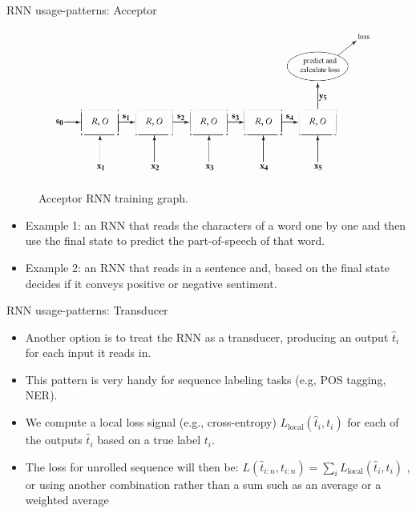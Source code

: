 \documentclass[handout]{beamer}
\begin{document}
\begin{frame}{RNN usage-patterns: Acceptor}
\begin{scriptsize}
  \begin{figure}[h]
        	\includegraphics[scale = 0.3]{pics/acceptor.png}
        	\caption{Acceptor RNN training graph.}
        \end{figure}
\begin{itemize}

\item Example 1: an RNN that reads the characters of a word one by one and then use the final state to predict the part-of-speech of that word.

\item Example 2: an RNN that reads in a sentence and, based on the final state decides if it conveys positive or negative sentiment.




\end{itemize}
\end{scriptsize}
\end{frame}


\begin{frame}{RNN usage-patterns: Transducer}
\begin{scriptsize}
\begin{itemize}
\item Another option is to treat the RNN as a transducer, producing an output $\hat{t}_i$ for each input it reads in.
\item This pattern is very handy for sequence labeling tasks (e.g, POS tagging, NER).
\item We compute a local loss signal (e.g., cross-entropy)  $L_{\text{local}}(\hat{t}_{i},{t}_{i})$ for each of the outputs $\hat{t}_{i}$ based on a true label $t_i$.
\item The loss for unrolled sequence will then be: $L(\hat{t}_{i:n},{t}_{i:n}) =  \sum_{i} L_{\text{local}}(\hat{t}_{i},{t}_{i})$ , or using another combination rather than a sum such as an average or a
weighted average
\end{itemize}
\end{scriptsize}
\end{frame}
\end{document}
